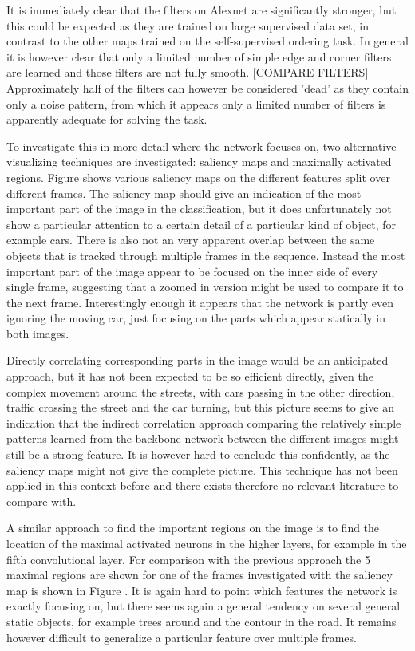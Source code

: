 It is immediately clear that the filters on Alexnet are significantly stronger, but this could be expected as they are trained on large supervised data set, in contrast to the other maps trained on the self-supervised ordering task. In general it is however clear that only a limited number of simple edge and corner filters are learned and those filters are not fully smooth. [COMPARE FILTERS] Approximately half of the filters can however be considered 'dead' as they contain only a noise pattern, from which it appears only a limited number of filters is apparently adequate for solving the task.

To investigate this in more detail where the network focuses on, two alternative visualizing techniques are investigated: saliency maps and maximally activated regions. Figure \needfig shows various saliency maps on the different features split over different frames. The saliency map should give an indication of the most important part of the image in the classification, but it does unfortunately not show a particular attention to a certain detail of a particular kind of object, for example cars. There is also not an very apparent overlap between the same objects that is tracked through multiple frames in the sequence. Instead the most important part of the image appear to be focused on the inner side of every single frame, suggesting that a zoomed in version might be used to compare it to the next frame. Interestingly enough it appears that the network is partly even ignoring the moving car, just focusing on the parts which appear statically in both images.  

Directly correlating corresponding parts in the image would be an anticipated approach, but it has not been expected to be so efficient directly, given the complex movement around the streets, with cars passing in the other direction, traffic crossing the street and the car turning, but this picture seems to give an indication that the indirect correlation approach comparing the relatively simple patterns learned from the backbone network between the different images might still be a strong feature. It is however hard to conclude this confidently, as the saliency maps might not give the complete picture. This technique has not been applied in this context before and there exists therefore no relevant literature to compare with.

A similar approach to find the important regions on the image is to find the location of the maximal activated neurons in the higher layers, for example in the fifth convolutional layer. For comparison with the previous approach the 5 maximal regions are shown for one of the frames investigated with the saliency map is shown in Figure \needfig. It is again hard to point which features the network is exactly focusing on, but there seems again a general tendency on several general static objects, for example trees around and the contour in the road. It remains however difficult to generalize a particular feature over multiple frames.

